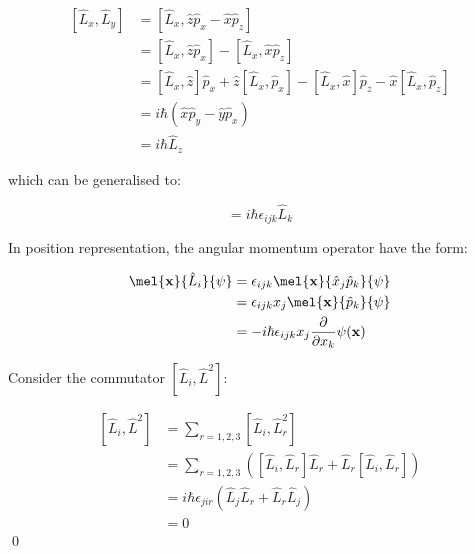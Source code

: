 \documentclass[12pt]{article}
\begin{document}
\begin{equation}
\begin{split}
    [\hat{L}_{x}, \hat{L}_{y}] &= [\hat{L}_{x}, \hat{z} \hat{p}_{x} - \hat{x} \hat{p}_{z}] \\
    &= [\hat{L}_{x}, \hat{z} \hat{p}_{x}] - [\hat{L}_{x}, \hat{x} \hat{p}_{z}] \\
    &= [\hat{L}_{x}, \hat{z}] \hat{p}_{x} + \hat{z} [\hat{L}_{x}, \hat{p}_{x}] - [\hat{L}_{x}, \hat{x}] \hat{p}_{z} - \hat{x} [\hat{L}_{x}, \hat{p}_{z}] \\
    &= i\hbar (\hat{x} \hat{p}_{y} - \hat{y} \hat{p}_{x}) \\
    &= i\hbar \hat{L}_{z}
\end{split}
\end{equation}

which can be generalised to:

\begin{equation}
    [\hat{L}_{i}, \hat{L}_{j}] = i\hbar \epsilon_{ijk} \hat{L}_{k}
\end{equation}

In position representation, the angular momentum operator have the form:

\begin{equation}
\begin{split}
    \mel{\mathbf{x}}{\hat{L}_{i}}{\psi} &= \epsilon_{ijk} \mel{\mathbf{x}}{\hat{x}_{j} \hat{p}_{k}}{\psi} \\
    &= \epsilon_{ijk} x_{j} \mel{\mathbf{x}}{\hat{p}_{k}}{\psi} \\
    &= -i\hbar \epsilon_{ijk} x_{j} \frac{\partial}{\partial x_{k}} \psi(\mathbf{x})
\end{split}
\end{equation}

Consider the commutator $[\hat{L}_{i}, \hat{L}^{2}]$:

\begin{equation}
\begin{split}
    [\hat{L}_{i}, \hat{L}^{2}] &= \sum_{r = 1, 2, 3} [\hat{L}_{i}, \hat{L}_{r}^{2}] \\
    &= \sum_{r = 1, 2, 3} \left( [\hat{L}_{i}, \hat{L}_{r}] \hat{L}_{r} + \hat{L}_{r} [\hat{L}_{i}, \hat{L}_{r}] \right) \\
    &= i\hbar \epsilon_{jir} (\hat{L}_{j} \hat{L}_{r} + \hat{L}_{r} \hat{L}_{j}) \\
    &= 0
\end{split}
\end{equation}
\qed
\end{document}
